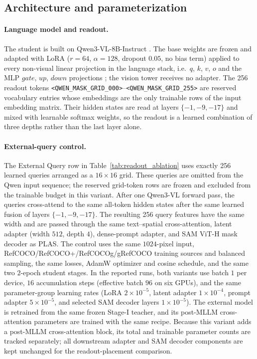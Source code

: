 \subsection{Architecture and parameterization}
\label{sec:app_arch}

\paragraph{Language model and readout.}
The student is built on Qwen3-VL-8B-Instruct \cite{Bai2025Qwen3VL}. The base weights are frozen and adapted with LoRA ($r{=}64$, $\alpha{=}128$, dropout $0.05$, no bias term) applied to every non-visual linear projection in the language stack, i.e.\ $q$, $k$, $v$, $o$ and the MLP $gate$, $up$, $down$ projections \cite{Hu2022LoRA}; the vision tower receives no adapter. The 256 readout tokens \texttt{<QWEN\_MASK\_GRID\_000>}--\texttt{<QWEN\_MASK\_GRID\_255>} are reserved vocabulary entries whose embeddings are the only trainable rows of the input embedding matrix. Their hidden states are read at layers $\{-1,-9,-17\}$ and mixed with learnable softmax weights, so the readout is a learned combination of three depths rather than the last layer alone.

\paragraph{External-query control.}
The External Query row in Table~\ref{tab:readout_ablation} uses exactly 256 learned queries arranged as a $16\times16$ grid. These queries are omitted from the Qwen input sequence; the reserved grid-token rows are frozen and excluded from the trainable budget in this variant. After one Qwen3-VL forward pass, the queries cross-attend to the same all-token hidden states after the same learned fusion of layers $\{-1,-9,-17\}$. The resulting 256 query features have the same width and are passed through the same text--spatial cross-attention, latent adapter (width $512$, depth $4$), dense-prompt adapter, and SAM ViT-H mask decoder as PLAS. The control uses the same $1024$-pixel input, RefCOCO/RefCOCO+/RefCOCOg/gRefCOCO training sources and balanced sampling, the same losses, AdamW optimizer and cosine schedule, and the same two $2$-epoch student stages. In the reported runs, both variants use batch $1$ per device, $16$ accumulation steps (effective batch $96$ on six GPUs), and the same parameter-group learning rates (LoRA $2\times10^{-5}$, latent adapter $1\times10^{-4}$, prompt adapter $5\times10^{-5}$, and selected SAM decoder layers $1\times10^{-5}$). The external model is retrained from the same frozen Stage-I teacher, and its post-MLLM cross-attention parameters are trained with the same recipe. Because this variant adds a post-MLLM cross-attention block, its total and trainable parameter counts are tracked separately; all downstream adapter and SAM decoder components are kept unchanged for the readout-placement comparison.

